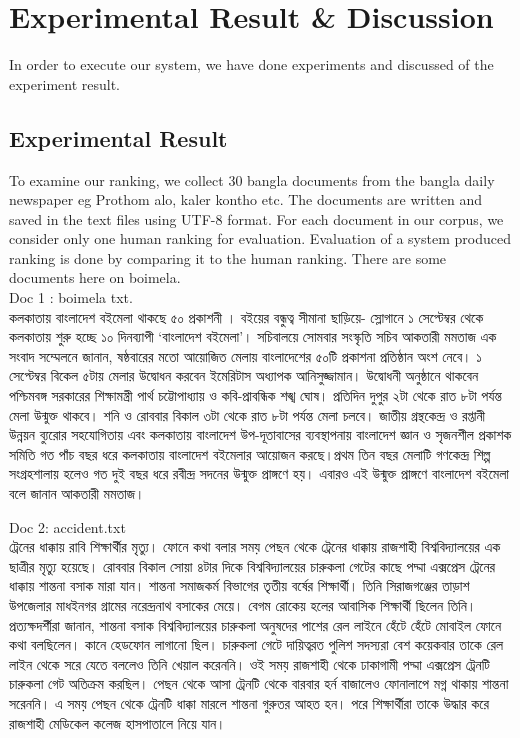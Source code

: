 \chapter{Experimental Result \& Discussion}
\label{Ch_Chapter5}


In order to execute our system, we have done experiments and discussed of the experiment result.

\section{Experimental Result}

To examine our ranking, we collect 30 bangla documents from the bangla daily newspaper eg Prothom alo, kaler kontho etc. The documents are written and saved in the text files using UTF-8 format. For each document in our corpus, we consider only one human ranking for evaluation. Evaluation of a system produced ranking is done by comparing it to the human ranking. There are some documents here on boimela.\\

Doc 1 : boimela txt.\\
{\unicodefont কলকাতায় বাংলাদেশ বইমেলা থাকছে ৫০ প্রকাশনী । বইয়ের বন্ধুত্ব সীমানা ছাড়িয়ে- স্লোগানে ১ সেপ্টেম্বর থেকে কলকাতায় শুরু হচ্ছে ১০ দিনব্যাপী ‘বাংলাদেশ বইমেলা’। সচিবালয়ে সোমবার সংস্কৃতি সচিব আকতারী মমতাজ এক সংবাদ সম্মেলনে জানান, ষষ্ঠবারের মতো আয়োজিত মেলায় বাংলাদেশের ৫০টি প্রকাশনা প্রতিষ্ঠান অংশ নেবে। ১ সেপ্টেম্বর বিকেল ৫টায় মেলার উদ্বোধন করবেন ইমেরিটাস অধ্যাপক আনিসুজ্জামান। উদ্বোধনী অনুষ্ঠানে থাকবেন পশ্চিমবঙ্গ সরকারের শিক্ষামন্ত্রী পার্থ চট্টোপাধ্যায় ও কবি-প্রাবন্ধিক শঙ্খ ঘোষ। প্রতিদিন দুপুর ২টা থেকে রাত ৮টা পর্যন্ত মেলা উন্মুক্ত থাকবে। শনি ও রোববার বিকাল ৩টা থেকে রাত ৮টা পর্যন্ত মেলা চলবে।
জাতীয় গ্রন্থকেন্দ্র ও রপ্তানী উন্নয়ন ব্যুরোর সহযোগিতায় এবং কলকাতায় বাংলাদেশ উপ-দূতাবাসের ব্যবস্থাপনায় বাংলাদেশ জ্ঞান ও সৃজনশীল প্রকাশক সমিতি গত পাঁচ বছর ধরে কলকাতায় বাংলাদেশ বইমেলার আয়োজন করছে।প্রথম তিন বছর মেলাটি গণকেন্দ্র শিল্প সংগ্রহশালায় হলেও গত দুই বছর ধরে রবীন্দ্র সদনের উন্মুক্ত প্রাঙ্গণে হয়। এবারও এই উন্মুক্ত প্রাঙ্গণে বাংলাদেশ বইমেলা বলে জানান আকতারী মমতাজ।}


Doc 2: accident.txt\\

{\unicodefont ট্রেনের ধাক্কায় রাবি শিক্ষার্থীর মৃত্যু। ফোনে কথা বলার সময় পেছন থেকে ট্রেনের ধাক্কায় রাজশাহী বিশ্ববিদ্যালয়ের এক ছাত্রীর মৃত্যু হয়েছে। রোববার বিকাল সোয়া ৪টার দিকে বিশ্ববিদ্যালয়ের চারুকলা গেটের কাছে পদ্মা এক্সপ্রেস ট্রেনের ধাক্কায় শান্তনা বসাক মারা যান।  শান্তনা সমাজকর্ম বিভাগের তৃতীয় বর্ষের শিক্ষার্থী। তিনি সিরাজগঞ্জের তাড়াশ উপজেলার মাধইনগর গ্রামের নরেন্দ্রনাথ বসাকের মেয়ে। বেগম রোকেয় হলের আবাসিক শিক্ষার্থী ছিলেন তিনি। প্রত্যক্ষদর্শীরা জানান, শান্তনা বসাক বিশ্ববিদ্যালয়ের চারুকলা অনুষদের পাশের রেল লাইনে হেঁটে হেঁটে মোবাইল ফোনে কথা বলছিলেন। কানে হেডফোন লাগানো ছিল। চারুকলা গেটে দায়িত্বরত পুলিশ সদস্যরা বেশ কয়েকবার তাকে রেল লাইন থেকে সরে যেতে বললেও তিনি খেয়াল করেননি।   ওই সময় রাজশাহী থেকে ঢাকাগামী পদ্মা এক্সপ্রেস ট্রেনটি চারুকলা গেট অতিক্রম করছিল। পেছন থেকে আসা ট্রেনটি থেকে বারবার হর্ন বাজালেও ফোনালাপে মগ্ন থাকায় শান্তনা সরেননি। এ সময় পেছন থেকে ট্রেনটি ধাক্কা মারলে শান্তনা গুরুতর আহত হন। পরে শিক্ষার্থীরা তাকে উদ্ধার করে রাজশাহী মেডিকেল কলেজ হাসপাতালে নিয়ে যান।}



